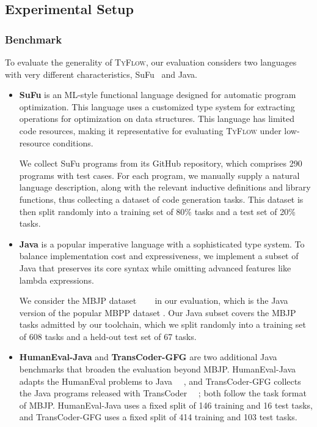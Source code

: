 \documentclass[manuscript,screen]{acmart}
\newcommand{\toolname}[1]{\textsc{#1}}
\newcommand{\mainname}{\toolname{TyFlow}\xspace}
\begin{document}
\subsection{Experimental Setup}

\subsubsection{Benchmark}
To evaluate the generality of \mainname, our evaluation considers two languages with very different characteristics, SuFu~\cite{DBLP:journals/pacmpl/JiZPXH24} and Java.
\begin{itemize}
 \item \textbf{SuFu} is an ML-style functional language designed for automatic program optimization. This language uses a customized type system for extracting operations for optimization on data structures.
 This language has limited code resources, making it representative for evaluating \mainname under low-resource conditions.

 We collect SuFu programs from its GitHub repository, which comprises 290 programs with test cases. For each program, we manually supply a natural language description, along with the relevant inductive definitions and library functions, thus collecting a dataset of code generation tasks.
 This dataset is then split randomly into a training set of 80\% tasks and a test set of 20\% tasks.

 \item \textbf{Java} is a popular imperative language with a sophisticated type system.    {\color{revblue}To balance } implementation cost and   expressiveness, we implement a subset of Java that preserves its core syntax while omitting advanced features like lambda expressions.

 We consider the MBJP dataset {\color{revblue}~\mbox{%
\cite{DBLP:conf/iclr/AthiwaratkunGWL23} }\hskip0pt%
} in our evaluation, which is the Java version of the popular MBPP dataset  . Our Java subset covers    {\color{revblue}the MBJP tasks admitted by our toolchain, which we split } randomly into a training set of    {\color{revblue}608 } tasks and a  {\color{revblue}held-out } test set of    {\color{revblue}67 tasks.
}

 \item \textbf{\color{revblue}HumanEval-Java} {\color{revblue}and }\textbf{\color{revblue}TransCoder-GFG} {\color{revblue}are two additional Java benchmarks that broaden the evaluation beyond MBJP. HumanEval-Java adapts the HumanEval problems to Java~\mbox{%
\cite{DBLP:journals/corr/abs-2107-03374}}\hskip0pt%
, and TransCoder-GFG collects the Java programs released with TransCoder~\mbox{%
\cite{DBLP:conf/nips/LachauxROC20}}\hskip0pt%
; both follow the task format of MBJP. 
HumanEval-Java uses a fixed split of 146 training and 16 test tasks, and TransCoder-GFG uses a fixed split of 414 training and 103 test tasks.
} \end{itemize}
\end{document}

